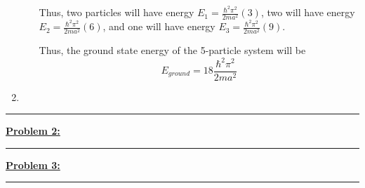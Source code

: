 \documentclass[twoside]{article}
\begin{document}
\begin{enumerate}[label=\alph*]
\begin{enumerate}
      Thus, two particles will have energy $E_1 = \frac{\hbar^2 \pi^2}{2ma^2} (3)$, two will have energy $E_2 = \frac{\hbar^2 \pi^2}{2ma^2} (6)$, and one will have energy $E_3 = \frac{\hbar^2 \pi^2}{2ma^2} (9)$.

      Thus, the ground state energy of the 5-particle system will be 
      \[ \boxed{E_{ground} = 18 \frac{\hbar^2 \pi^2}{2ma^2}} \]
   \end{enumerate}

   \item 
\end{enumerate}

\vskip 0.5cm
\hrule
\vskip 0.5cm


\underline{\textbf{Problem 2:}}


\vskip 0.5cm
\hrule
\vskip 0.5cm



\underline{\textbf{Problem 3:}}



\vskip 0.5cm
\hrule
\vskip 0.5cm
\end{document}
